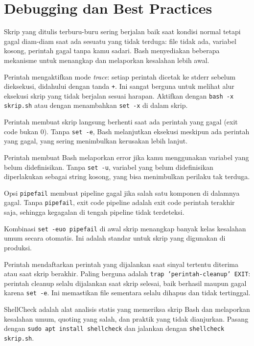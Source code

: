 \section{Debugging dan Best Practices}
\label{sec:debugging-best-practices}

Skrip yang ditulis terburu-buru sering berjalan baik saat kondisi normal
tetapi gagal diam-diam saat ada sesuatu yang tidak terduga: file tidak
ada, variabel kosong, perintah gagal tanpa kamu sadari. Bash menyediakan
beberapa mekanisme untuk menangkap dan melaporkan kesalahan lebih awal.

Perintah  mengaktifkan mode \textit{trace}: setiap perintah
dicetak ke stderr sebelum dieksekusi, didahului dengan tanda \texttt{+}.
Ini sangat berguna untuk melihat alur eksekusi skrip yang tidak berjalan
sesuai harapan. Aktifkan dengan \texttt{bash -x skrip.sh} atau dengan
menambahkan \texttt{set -x} di dalam skrip.

Perintah  membuat skrip langsung berhenti saat ada perintah
yang gagal (exit code bukan 0). Tanpa \texttt{set -e}, Bash melanjutkan
eksekusi meskipun ada perintah yang gagal, yang sering menimbulkan
kerusakan lebih lanjut.

Perintah  membuat Bash melaporkan error jika kamu menggunakan
variabel yang belum didefinisikan. Tanpa \texttt{set -u}, variabel yang
belum didefinisikan diperlakukan sebagai string kosong, yang bisa
menimbulkan perilaku tak terduga.

Opsi \texttt{pipefail} membuat pipeline gagal jika salah satu komponen
di dalamnya gagal. Tanpa \texttt{pipefail}, exit code pipeline adalah
exit code perintah terakhir saja, sehingga kegagalan di tengah pipeline
tidak terdeteksi.

Kombinasi \texttt{set -euo pipefail} di awal skrip menangkap banyak
kelas kesalahan umum secara otomatis. Ini adalah standar untuk skrip
yang digunakan di produksi.

Perintah  mendaftarkan perintah yang dijalankan saat sinyal
tertentu diterima atau saat skrip berakhir. Paling berguna adalah
\texttt{trap 'perintah-cleanup' EXIT}: perintah cleanup selalu dijalankan
saat skrip selesai, baik berhasil maupun gagal karena \texttt{set -e}.
Ini memastikan file sementara selalu dihapus dan tidak tertinggal.

ShellCheck adalah alat analisis statis yang memeriksa skrip Bash dan
melaporkan kesalahan umum, quoting yang salah, dan praktik yang tidak
dianjurkan. Pasang dengan \texttt{sudo apt install shellcheck} dan
jalankan dengan \texttt{shellcheck skrip.sh}.

